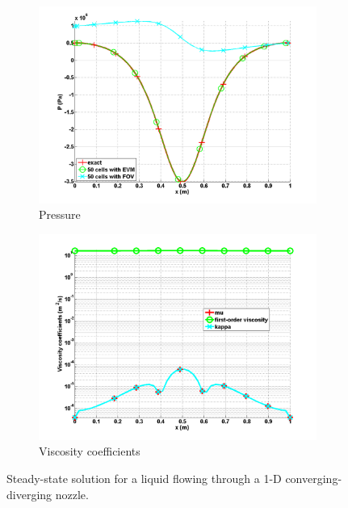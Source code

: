\documentclass[preprint,10pt]{elsarticle}
\begin{document}
\begin{figure}[H]
        \begin{subfigure}[b]{0.495\textwidth}
                \centering
                \includegraphics[width=\textwidth]{liquid_pressure_numerical_and_exact_50.png}
                \caption{Pressure}
                \label{fig:1d_nozzle_liq_press}
        \end{subfigure}
        
        \begin{subfigure}[b]{0.495\textwidth}
                \centering
                \includegraphics[width=\textwidth]{liquid_viscosity_numerical50.png}
                \caption{Viscosity coefficients}
                \label{fig:1d_nozzle_liq_visc}
        \end{subfigure}
        \caption{Steady-state solution for a liquid flowing through a 1-D converging-diverging nozzle.}\label{fig:1d_liq_nozzle}
\end{figure}
\end{document}
